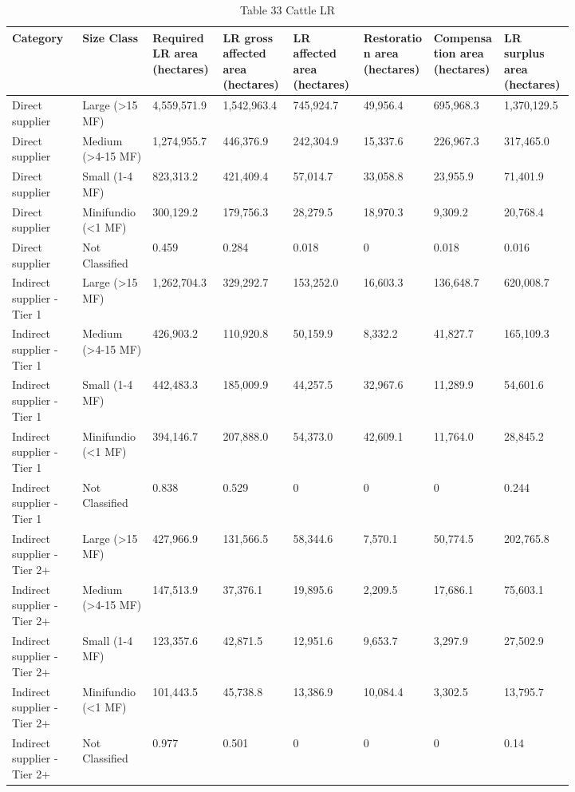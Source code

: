 \documentclass[12pt]{article}
\begin{document}
\begin{table}[H]
\centering
\caption{Table 33 Cattle LR}
{\fontsize{12}{14}\selectfont
\setlength{\tabcolsep}{3pt}
\renewcommand{\arraystretch}{1.08}
\begin{tabular}{p{0.102\linewidth}p{0.102\linewidth}p{0.102\linewidth}p{0.102\linewidth}p{0.102\linewidth}p{0.102\linewidth}p{0.102\linewidth}p{0.102\linewidth}}
\toprule
Category & Size Class & Required LR area (hectares) & LR gross affected area (hectares) & LR affected area (hectares) & Restoration area (hectares) & Compensation area (hectares) & LR surplus area (hectares) \\
\midrule
Direct supplier & Large (>15 MF) & 4,559,571.9 & 1,542,963.4 & 745,924.7 & 49,956.4 & 695,968.3 & 1,370,129.5 \\
Direct supplier & Medium (>4-15 MF) & 1,274,955.7 & 446,376.9 & 242,304.9 & 15,337.6 & 226,967.3 & 317,465.0 \\
Direct supplier & Small (1-4 MF) & 823,313.2 & 421,409.4 & 57,014.7 & 33,058.8 & 23,955.9 & 71,401.9 \\
Direct supplier & Minifundio (<1 MF) & 300,129.2 & 179,756.3 & 28,279.5 & 18,970.3 & 9,309.2 & 20,768.4 \\
Direct supplier & Not Classified & 0.459 & 0.284 & 0.018 & 0 & 0.018 & 0.016 \\
Indirect supplier - Tier 1 & Large (>15 MF) & 1,262,704.3 & 329,292.7 & 153,252.0 & 16,603.3 & 136,648.7 & 620,008.7 \\
Indirect supplier - Tier 1 & Medium (>4-15 MF) & 426,903.2 & 110,920.8 & 50,159.9 & 8,332.2 & 41,827.7 & 165,109.3 \\
Indirect supplier - Tier 1 & Small (1-4 MF) & 442,483.3 & 185,009.9 & 44,257.5 & 32,967.6 & 11,289.9 & 54,601.6 \\
Indirect supplier - Tier 1 & Minifundio (<1 MF) & 394,146.7 & 207,888.0 & 54,373.0 & 42,609.1 & 11,764.0 & 28,845.2 \\
Indirect supplier - Tier 1 & Not Classified & 0.838 & 0.529 & 0 & 0 & 0 & 0.244 \\
Indirect supplier - Tier 2+ & Large (>15 MF) & 427,966.9 & 131,566.5 & 58,344.6 & 7,570.1 & 50,774.5 & 202,765.8 \\
Indirect supplier - Tier 2+ & Medium (>4-15 MF) & 147,513.9 & 37,376.1 & 19,895.6 & 2,209.5 & 17,686.1 & 75,603.1 \\
Indirect supplier - Tier 2+ & Small (1-4 MF) & 123,357.6 & 42,871.5 & 12,951.6 & 9,653.7 & 3,297.9 & 27,502.9 \\
Indirect supplier - Tier 2+ & Minifundio (<1 MF) & 101,443.5 & 45,738.8 & 13,386.9 & 10,084.4 & 3,302.5 & 13,795.7 \\
Indirect supplier - Tier 2+ & Not Classified & 0.977 & 0.501 & 0 & 0 & 0 & 0.14 \\
\bottomrule
\end{tabular}
}
\end{table}
\end{document}
